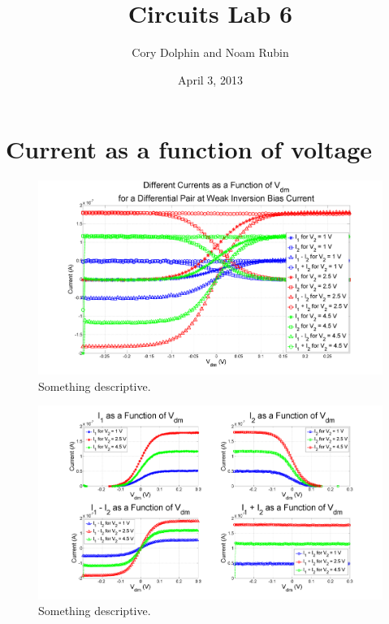 \documentclass{article}
\title{Circuits Lab 6}
\author{Cory Dolphin and Noam Rubin}
\date{April 3, 2013}
\begin{document}
\maketitle

\section*{Current as a function of voltage}

\begin{figure}[H]
\centering
\includegraphics[width=\linewidth]{./Figures/AllCurrentsOneFigure}
\caption{Something descriptive. }
\label{fig:AllCurrentsOneFigure }
\end{figure}


\begin{figure}[H]
\centering
\includegraphics[width=\linewidth]{./Figures/AllCurrentsSubplot}
\caption{Something descriptive.}
\label{fig:AllCurrentsSubplot}
\end{figure}
\end{document}
